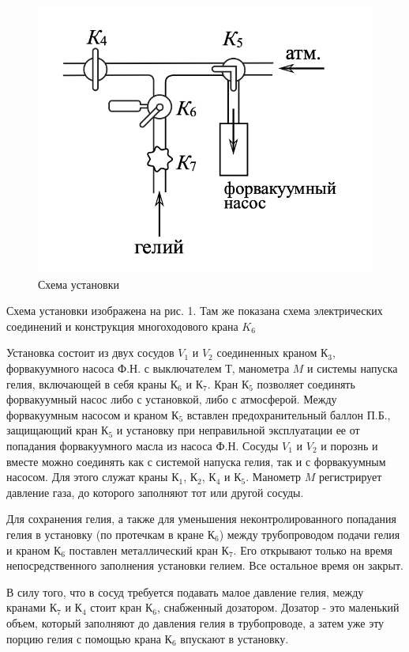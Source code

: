 \documentclass[12pt,a4paper]{article}
\begin{document}
\begin{figure}[htp]
	\includegraphics[scale=0.6]{scheme2.png}
	\caption{Схема установки}
\end{figure}
Схема установки изображена на рис. 1. Там же показана схема электрических соединений и конструкция многоходового крана $K_6$

Установка состоит из двух сосудов $V_1$ и $V_2$ соединенных краном $К_3$, форвакуумного насоса Ф.Н. с выключателем $Т$, манометра $M$ и системы напуска гелия, включающей в себя краны $К_6$ и $К_7$. Кран $К_5$ позволяет соединять форвакуумный насос либо с установкой, либо с атмосферой. Между форвакуумным насосом и краном $К_5$ вставлен предохранительный баллон П.Б., защищающий кран $К_5$ и установку при неправильной эксплуатации ее от попадания форвакуумного масла из насоса Ф.Н. Сосуды $V_1$ и $V_2$ и порознь и вместе можно соединять как с системой напуска гелия, так и с форвакуумным насосом. Для этого служат краны $К_1$, $К_2$, $К_4$ и $К_5$. Манометр  $M$
регистрирует давление газа, до которого заполняют тот или другой
сосуды.

Для сохранения гелия, а также для уменьшения неконтролированного попадания гелия в установку (по протечкам в кране $К_6$) между
трубопроводом подачи гелия и краном $К_6$ поставлен металлический
кран $К_7$. Его открывают только на время непосредственного заполнения установки гелием. Все остальное время он закрыт.

В силу того, что в сосуд требуется подавать малое давление гелия,
между кранами $К_7$ и $К_4$ стоит кран $К_6$, снабженный дозатором. Дозатор - это маленький объем, который заполняют до давления гелия в трубопроводе, а затем уже эту порцию гелия с помощью крана $К_6$ впускают в установку.
\end{document}
